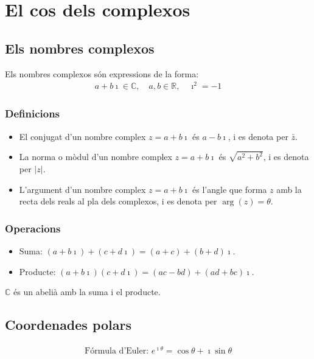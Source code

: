\section{El cos dels complexos}
\subsection{Els nombres complexos}
Els nombres complexos són expressions de la forma:
\begin{align}
    a + b \imath \in \mathbb{C}, \quad a,b \in \mathbb{R}, \quad \imath ^{2} = -1
\end{align}

\subsubsection*{Definicions}
\begin{itemize}
    \item El conjugat d'un nombre complex $z = a + b \imath$ és $a - b \imath$, i es denota per $\bar{z}$.
    \item La norma o mòdul d'un nombre complex $z = a + b \imath$ és $\sqrt{a^{2} + b^{2}}$, i es denota per $|z|$.
    \item L'argument d'un nombre complex $z = a + b \imath$ és l'angle que forma $z$ amb la recta dels reals al pla dels complexos, i es denota per $\operatorname{arg}(z) = \theta$.
\end{itemize}

\subsubsection*{Operacions}
\begin{itemize}
    \item Suma: $ (a + b \imath) + (c + d \imath) = (a + c) + (b + d) \imath$.
    \item Producte: $(a + b \imath) (c + d \imath) = (ac - bd) + (ad + bc) \imath$.
\end{itemize}
$\mathbb{C}$ és un abelià amb la suma i el producte.

\subsection{Coordenades polars}
\begin{align}
    \text{Fórmula d'Euler: } e^{\imath \theta} = \cos \theta + \imath \sin \theta
\end{align}

